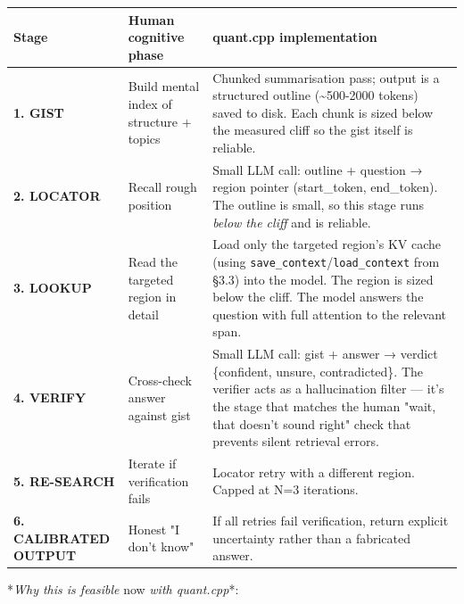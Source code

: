 \documentclass[11pt]{article}
\begin{document}
\begin{center}
\begin{tabular}{lll}
\toprule
Stage & Human cognitive phase & quant.cpp implementation \\
\midrule
\textbf{1. GIST} & Build mental index of structure + topics & Chunked summarisation pass; output is a structured outline (\textasciitilde{}500-2000 tokens) saved to disk. Each chunk is sized below the measured cliff so the gist itself is reliable. \\
\textbf{2. LOCATOR} & Recall rough position & Small LLM call: outline + question → region pointer (start\_token, end\_token). The outline is small, so this stage runs \textit{below the cliff} and is reliable. \\
\textbf{3. LOOKUP} & Read the targeted region in detail & Load only the targeted region's KV cache (using \texttt{save\_context}/\texttt{load\_context} from §3.3) into the model. The region is sized below the cliff. The model answers the question with full attention to the relevant span. \\
\textbf{4. VERIFY} & Cross-check answer against gist & Small LLM call: gist + answer → verdict \{confident, unsure, contradicted\}. The verifier acts as a hallucination filter — it's the stage that matches the human "wait, that doesn't sound right" check that prevents silent retrieval errors. \\
\textbf{5. RE-SEARCH} & Iterate if verification fails & Locator retry with a different region. Capped at N=3 iterations. \\
\textbf{6. CALIBRATED OUTPUT} & Honest "I don't know" & If all retries fail verification, return explicit uncertainty rather than a fabricated answer. \\
\bottomrule
\end{tabular}
\end{center}


*\textit{Why this is feasible }now\textit{ with quant.cpp}*:
\end{document}
